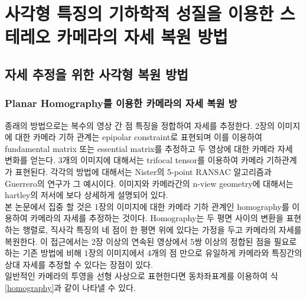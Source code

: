 \documentclass[master,korean,final]{cbnu-ecs}
\begin{document}
\chapter{사각형 특징의 기하학적 성질을 이용한 스테레오 카메라의 자세 복원 방법}

\section{자세 추정을 위한 사각형 복원 방법}
\subsection{Planar Homography를 이용한 카메라의 자세 복원 방}

종래의 방법으로는 복수의 영상 간 점 특징을 정합하여 자세를 추정한다. 2장의 이미지에 대한 카메라 기하 관계는 epipolar constraint로 표현되며 이를 이용하여 fundamental matrix 또는 essential matrix를 추정하고 두 영상에 대한 카메라 자세 변화를 얻는다. 3개의 이미지에 대해서는 trifocal tensor를 이용하여 카메라 기하관계가 표현된다. 각각의 방법에 대해서는 Nister의 5-point RANSAC 알고리즘\cite{Nister2005}과 Guerrero의 연구\cite{Guerrero2008}가 그 예시이다. 이미지와 카메라간의 n-view geometry에 대해서는 hartley의 저서\cite{Hartley2003}에 보다 상세하게 설명되어 있다.\\
본 논문에서 집중 할 것은 1장의 이미지에 대한 카메라 기하 관계인 homography를 이용하여 카메라의 자세를 추정하는 것이다. Homography는 두 평면 사이의 변환을 표현하는 행렬로, 직사각 특징의 네 점이 한 평면 위에 있다는 가정을 두고 카메라의 자세를 복원한다. 이 접근에서는 2장 이상의 연속된 영상에서 5쌍 이상의 정합된 점을 필요로 하는 기존 방법에 비해 1장의 이미지에서 4개의 점 만으로 유일하게 카메라와 특징간의 상대 자세를 추정할 수 있다는 장점이 있다. \\
일반적인 카메라의 투영을 선형 사상으로 표현한다면 동차좌표계를 이용하여 식 \eqref{homography}과 같이 나타낼 수 있다.
\end{document}
